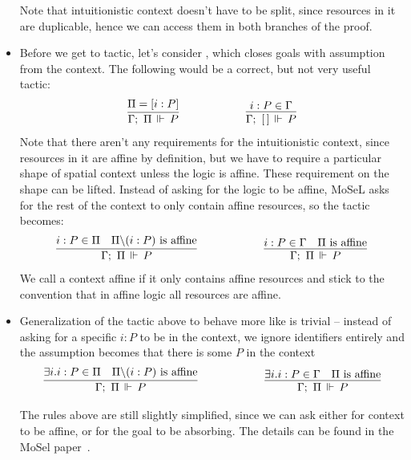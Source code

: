 \begin{itemize}
   Note that intuitionistic context doesn't have to be split, since resources in it are duplicable, hence we can access them in both branches of the proof.
\item Before we get to  tactic, let's consider , which closes goals with assumption  from the context.
  The following would be a correct, but not very useful tactic:
  \begin{align*}
      \infer
        {\entailsD P}
        {\SpatD = [i : P]}
    & \hspace{5em}
    & \infer
        {\entails {\IntuD} {[\,]} P}
        {i : P \in \IntuD}
  \end{align*}
  Note that there aren't any requirements for the intuitionistic context, since resources in it are affine by definition, but we have to require a particular shape of spatial context unless the logic is affine.
  These requirement on the shape can be lifted.
  Instead of asking for the logic to be affine, MoSeL asks for the rest of the context to only contain affine resources, so the tactic becomes:
  \begin{align*}
      \infer%
        {\entailsD P}
        {i : P \in \SpatD &
         \SpatD \backslash (i : P) \text{ is affine}}
    & \hspace{5em}
    & \infer%
        {\entailsD P}
        {i : P \in \IntuD &
         \SpatD \text{ is affine}}
  \end{align*}
  We call a context affine if it only contains affine resources and stick to the convention that in affine logic all resources are affine.
\item Generalization of the tactic above to behave more like  is trivial -- instead of asking for a specific \(i : P\) to be in the context, we ignore identifiers entirely and the assumption becomes that there is some \(P\) in the context
  \begin{align*}
      \infer%
        {\entailsD P}
        {\exists i. i : P \in \SpatD &
         \SpatD \backslash (i : P) \text{ is affine}}
    & \hspace{5em}
    & \infer%
        {\entailsD P}
        {\exists i. i : P \in \IntuD &
         \SpatD \text{ is affine}}
  \end{align*}

  The rules above are still slightly simplified, since we can ask either for context to be affine, or for the goal to be absorbing.
  The details can be found in the MoSel paper~\cite[Section 2.3]{krebbersMoSeLGeneralExtensible2018}.
\end{itemize}

